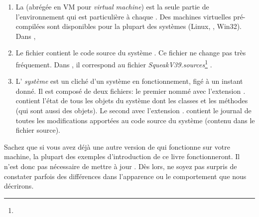 \documentclass[a4paper,10pt,twoside]{book}
\begin{document}
\begin{enumerate}

\item La  (abrégée en VM pour
  \emph{virtual machine}) est la seule partie de l'environnement qui
  est particulière à chaque . Des machines virtuelles pré-compilées sont disponibles pour la plupart des
  systèmes (Linux, \macosx, Win32). Dans ,  %

  \item Le fichier  contient le code source du système
    \pharo. Ce fichier ne change pas très fréquement. Dans , il
    correspond au fichier
    \emph{SqueakV39.sources}\footnote{}
.

\item L' \emph{système}  est un cliché d'un système
  \pharo{} en fonctionnement, figé à un instant donné. 
Il est composé de deux fichiers: le premier nommé avec l'extension
\emph{.} contient l'état de tous les objets du système
dont les classes et les méthodes (qui sont aussi des
objets). Le second avec l'extension \emph{.} contient
le journal de toutes les modifications apportées au code source du
système (contenu dans le fichier source).
\end{enumerate}



Sachez que si vous avez déjà une autre version de \pharo qui fonctionne sur votre
machine, la plupart des exemples d'introduction de ce livre
fonctionneront. Il n'est donc pas nécessaire de mettre à jour \pharo.
Dès lors, ne soyez pas surpris de constater parfois des différences dans l'apparence ou le comportement que nous décrirons.
\end{document}
